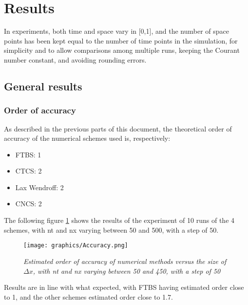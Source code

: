 

\section{Results}
In experiments, both time and space vary in [0,1], and the number of space points has been kept equal to the number of time points in the simulation, for simplicity and to allow comparisons among multiple runs, keeping the Courant number constant, and avoiding rounding errors.

\subsection{General results}

\subsubsection{Order of accuracy}
As described in the previous parts of this document, the theoretical order of accuracy of the numerical schemes used is, respectively:
\begin{itemize}
	\item FTBS: 1
	\item CTCS: 2
	\item Lax Wendroff: 2
	\item CNCS: 2
\end{itemize}
The following figure \ref{fig:orderofacc} shows the results of the experiment of 10 runs of the 4 schemes, with nt and nx varying between 50 and 500, with a step of 50.
\begin{figure}[H]
	\begin{center}
		\texttt{[image: graphics/Accuracy.png]}
	\end{center}%
	\caption[Order of accuracy of numerical methods]{ \em Estimated order of accuracy of numerical methods versus the size of $\Delta x$, with nt and nx varying between 50 and 450, with a step of 50}
	\label{fig:orderofacc}
\end{figure}
Results are in line with what expected, with FTBS having estimated order close to 1, and the other schemes estimated order close to 1.7.

